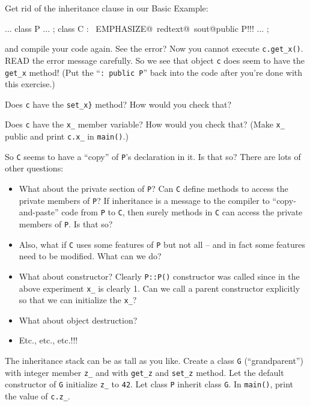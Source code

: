 \begin{ex} Get rid of the inheritance clause in our Basic Example:
\begin{console}[commandchars=\~\@\!]
...
class P
{
      ...
};
class C : ~EMPHASIZE@~redtext@~sout@public P!!!
{     
      ...
};
\end{console}
and compile your code again. See the error? Now you cannot execute \verb!c.get_x()!. READ the error message carefully. So we see that object \verb!c! does seem to have the \verb!get_x! method! (Put the ``\verb!: public P!'' back into the code after you're done with this exercise.)
\end{ex}

\begin{ex} Does \verb!c! have the \verb!set_x}! method? How
would you check that?
\end{ex}

\begin{ex} Does \verb!c! have the \verb!x_! member variable?
How would you check that? (Make \verb!x_! public and print \verb!c.x_! in \verb!main()!.)
\end{ex}

So \verb!C! seems to have a ``copy'' of \verb!P!'s
declaration in it. Is that so? There are lots of other questions:

\begin{itemize}
\item
  What about the private section of \verb!P!? Can \verb!C! define
  methods to access the private members of \verb!P!? If inheritance is a
  message to the compiler to ``copy-and-paste'' code from \verb!P! to
  \verb!C!, then surely methods in \verb!C! can access the private
  members of \verb!P!. Is that so?
\item
  Also, what if \verb!C! uses some features of \verb!P! but not all --
  and in fact some features need to be modified. What can we do?
\item
  What about constructor? Clearly \verb!P::P()! constructor was called
  since in the above experiment \verb!x_! is clearly 1. Can we call a
  parent constructor explicitly so that we can initialize the
  \verb!x_!?
\item
  What about object destruction?
\item
  Etc., etc., etc.!!!
\end{itemize}

\begin{ex}
The inheritance stack can be as tall as you like. Create a class \verb!G! (``grandparent'') with integer member \verb!z_! and with \verb!get_z! and \verb!set_z! method. Let the default constructor of \verb!G! initialize \verb!z_! to \verb!42!. Let class \verb!P! inherit class \verb!G!. In \verb!main()!, print the value of \verb!c.z_!.
\end{ex}

